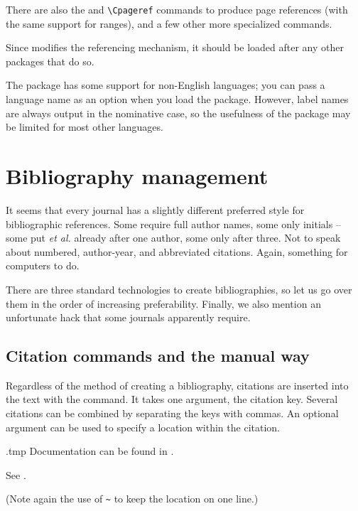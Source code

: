 There are also the  and \verb|\Cpageref|
commands to produce page references (with the same support for ranges),
and a few other more specialized commands.

\begin{gotcha}
Since  modifies the referencing mechanism,
it should be loaded after any other packages that do so.
\end{gotcha}

\begin{gotcha}
The  package has some support for non-English languages;
you can pass a language name as an option when you load the package.
However, label names are always output in the nominative case,
so the usefulness of the package may be limited for most other languages.
\end{gotcha}



%
%
%
\section{Bibliography management}\label{sec:bibliography}

It seems that every journal has a slightly different preferred style for bibliographic references.
Some require full author names, some only initials
-- some put \emph{et al.} already after one author, some only after three.
Not to speak about numbered, author-year, and abbreviated citations.
Again, something for computers to do.

There are three standard technologies to create bibliographies,
so let us go over them in the order of increasing preferability.
Finally, we also mention an unfortunate hack that some journals apparently require.

%
\subsection{Citation commands and the manual way}

Regardless of the method of creating a bibliography,
citations are inserted into the text with the  command.
It takes one argument, the citation key.
Several citations can be combined by separating the keys with commas.
An optional argument can be used to specify a location within the citation.

\begin{VerbatimOut}{\jobname.tmp}
Documentation can be found in
\cite{TLC, tikz}.

See \cite[Chapter~8]{TLC}.
\end{VerbatimOut}
\ShowExample
(Note again the use of \verb|~| to keep the location on one line.)


